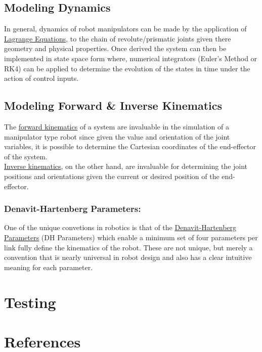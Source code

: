 \documentclass[12px]{article}
\begin{document}
    \subsection*{Modeling Dynamics}
      In general, dynamics of robot manipulators can be made by the application of \underline{Lagrange Equations}, to the chain of revolute/prismatic joints given there geometry and physical properties. Once derived the system can then be implemented in state space form where, numerical integrators (Euler's Method or RK4) can be applied to determine the evolution of the states in time under the action of control inputs.


    \subsection*{Modeling Forward \& Inverse Kinematics}

    The \underline{forward kinematics} of a system are invaluable in the simulation of a manipulator type robot since given the value and orientation of the joint variables, it is possible to determine the Cartesian coordinates of the end-effector of the system. \\

    \noindent \underline{Inverse kinematics}, on the other hand, are invaluable for determining the joint positions and orientations given the current or desired position of the end-effector.

    \subsubsection*{Denavit-Hartenberg Parameters:}
    One of the unique convetions in robotics is that of the \underline{Denavit-Hartenberg Parameters} (DH Parameters) which enable a minimum set of four parameters per link fully define the kinematics of the robot. These are not unique, but merely a convention that is nearly universal in robot design and also has a clear intuitive meaning for each parameter.













    \section*{Testing}

    \section*{References}
\end{document}
